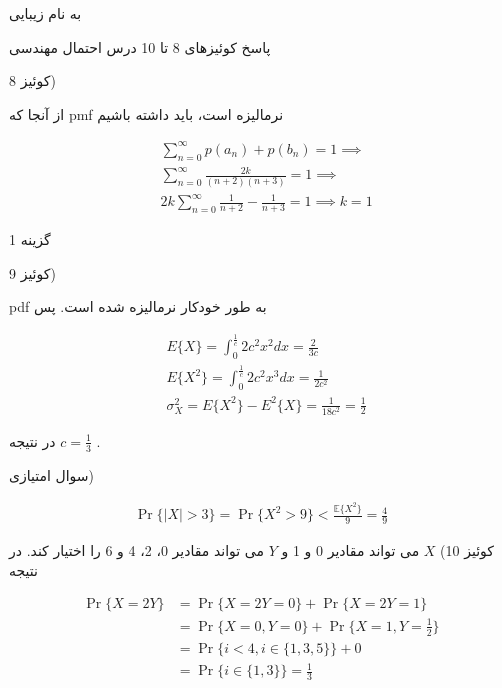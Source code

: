\documentclass{article}
\newcommand{\eqn}[1]{
\[\begin{split}
#1
\end{split}\]
}
\begin{document}
\LARGE
\begin{center}

به نام زیبایی


پاسخ کوئیزهای 8 تا 10 درس احتمال مهندسی

\end{center}
\hrulefill
\large

کوئیز 8)

از آنجا که pmf نرمالیزه است، باید داشته باشیم
\eqn{
&\sum_{n=0}^\infty p(a_n)+p(b_n)=1
\implies
\\&\sum_{n=0}^\infty \frac{2k}{(n+2)(n+3)}=1
\implies
\\&2k\sum_{n=0}^\infty \frac{1}{n+2}-\frac{1}{n+3}=1
\implies k=1
}

گزینه 1

کوئیز 9)

pdf به طور خودکار نرمالیزه شده است. پس
\eqn{
&E\{X\}=\int_0^\frac{1}{c}2c^2x^2dx=\frac{2}{3c}
\\&
E\{X^2\}=\int_0^\frac{1}{c}2c^2x^3dx=\frac{1}{2c^2}
\\&
\sigma_X^2=E\{X^2\}-E^2\{X\}=\frac{1}{18c^2}=\frac{1}{2}
}
در نتیجه
$
c=\frac{1}{3}
$
.

سوال امتیازی)
\eqn{
\Pr\{|X|>3\}=\Pr\{X^2>9\}<\frac{\mathbb{E}\{X^2\}}{9}=\frac{4}{9}
}

کوئیز 10)
$
X
$
می تواند مقادیر 0 و 1 و 
$
Y
$
می تواند مقادیر 0، 2، 4 و 6 را اختیار کند. در نتیجه
\eqn{
\Pr\{X=2Y\}&=\Pr\{X=2Y=0\}+\Pr\{X=2Y=1\}
\\&=\Pr\{X=0,Y=0\}+\Pr\{X=1,Y=\frac{1}{2}\}
\\&=\Pr\{i<4,i\in\{1,3,5\}\}+0
\\&=\Pr\{i\in\{1,3\}\}=\frac{1}{3}
}
\end{document}
